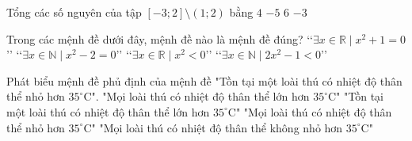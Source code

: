 \documentclass[12pt,a4paper,openany,oneside]{book}
\begin{document}
\begin{ex}%
	Tổng các  số nguyên của tập $[-3;2]\setminus(1;2)$ bằng
	 \choice
		 {$4$}
		 {$-5$}
		 {$6$}
		{\True$-3$} 
\end{ex}

\begin{ex}%
	Trong các mệnh đề dưới đây, mệnh đề nào  là mệnh đề đúng?
	 \choice
		{\lq\lq $\exists x\in \mathbb{R}\mid x^2+1=0$\rq\rq} 
		{\lq\lq $\exists x\in \mathbb{N}\mid x^2-2=0$\rq\rq}
		{\lq\lq $\exists x\in  \mathbb{R}\mid x^2< 0$\rq\rq}
		{\True \lq\lq $\exists x\in \mathbb{N}\mid 2x^2-1<  0$\rq\rq} 
\end{ex}

\begin{ex}%
	Phát biểu mệnh đề  phủ định của mệnh đề "Tồn tại một loài thú có nhiệt độ thân thể nhỏ hơn $35^\circ$C".
	\choice 
		{"Mọi loài thú có nhiệt độ thân thể lớn hơn $35^\circ$C"}
		{"Tồn tại một loài thú có nhiệt  độ thân thể lớn hơn $35^\circ$C"}
		{"Mọi loài thú có nhiệt độ thân thể  nhỏ hơn $35^\circ$C"}
		{\True "Mọi loài thú có nhiệt độ thân thể  không nhỏ hơn $35^\circ$C"} 
\end{ex}
\end{document}
